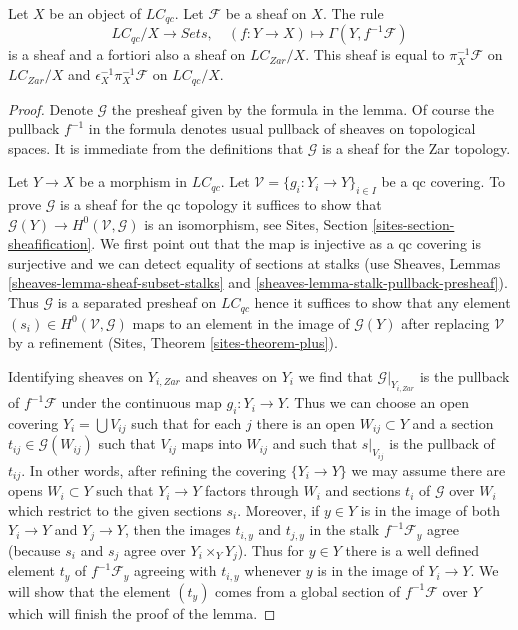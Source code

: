 \begin{lemma}
\label{lemma-describe-pullback-pi}
Let $X$ be an object of $\textit{LC}_{qc}$. Let $\mathcal{F}$ be a
sheaf on $X$. The rule
$$
\textit{LC}_{qc}/X \longrightarrow \textit{Sets},\quad
(f : Y \to X) \longmapsto \Gamma(Y, f^{-1}\mathcal{F})
$$
is a sheaf and a fortiori also a sheaf on $\textit{LC}_{Zar}/X$.
This sheaf is equal to
$\pi_X^{-1}\mathcal{F}$ on $\textit{LC}_{Zar}/X$ and
$\epsilon_X^{-1}\pi_X^{-1}\mathcal{F}$ on $\textit{LC}_{qc}/X$.
\end{lemma}

\begin{proof}
Denote $\mathcal{G}$ the presheaf given by the formula in the lemma.
Of course the pullback $f^{-1}$ in the formula denotes usual
pullback of sheaves on topological spaces. It is immediate
from the definitions that $\mathcal{G}$ is a sheaf for the Zar
topology.

\medskip\noindent
Let $Y \to X$ be a morphism in $\textit{LC}_{qc}$. Let
$\mathcal{V} = \{g_i : Y_i \to Y\}_{i \in I}$ be a qc covering.
To prove $\mathcal{G}$ is a sheaf for the qc topology it
suffices to show that
$\mathcal{G}(Y) \to H^0(\mathcal{V}, \mathcal{G})$
is an isomorphism, see Sites, Section \ref{sites-section-sheafification}.
We first point out that the map is injective as a qc covering
is surjective and we can detect equality of sections at stalks
(use Sheaves, Lemmas \ref{sheaves-lemma-sheaf-subset-stalks} and
\ref{sheaves-lemma-stalk-pullback-presheaf}). Thus
$\mathcal{G}$ is a separated presheaf on $\textit{LC}_{qc}$
hence it suffices to show that any element
$(s_i) \in H^0(\mathcal{V}, \mathcal{G})$
maps to an element in the image of $\mathcal{G}(Y)$
after replacing $\mathcal{V}$ by a refinement
(Sites, Theorem \ref{sites-theorem-plus}).

\medskip\noindent
Identifying sheaves on $Y_{i, Zar}$ and sheaves on $Y_i$ we find that
$\mathcal{G}|_{Y_{i, Zar}}$ is the pullback of $f^{-1}\mathcal{F}$ under
the continuous map $g_i : Y_i \to Y$. Thus we can choose an open covering
$Y_i = \bigcup V_{ij}$ such that for each $j$ there is an open
$W_{ij} \subset Y$ and a section $t_{ij} \in \mathcal{G}(W_{ij})$
such that $V_{ij}$ maps into $W_{ij}$ and such that
$s|_{V_{ij}}$ is the pullback of $t_{ij}$. In other words,
after refining the covering $\{Y_i \to Y\}$ we may assume there
are opens $W_i \subset Y$ such that $Y_i \to Y$ factors through $W_i$
and sections $t_i$ of $\mathcal{G}$ over $W_i$ which restrict
to the given sections $s_i$. Moreover, if $y \in Y$ is in the image
of both $Y_i \to Y$ and $Y_j \to Y$, then the images $t_{i, y}$
and $t_{j, y}$ in the stalk $f^{-1}\mathcal{F}_y$ agree
(because $s_i$ and $s_j$ agree over $Y_i \times_Y Y_j$).
Thus for $y \in Y$ there is a well defined element $t_y$ of
$f^{-1}\mathcal{F}_y$ agreeing with $t_{i, y}$ whenever $y$
is in the image of $Y_i \to Y$.
We will show that the element $(t_y)$ comes from a global section
of $f^{-1}\mathcal{F}$ over $Y$ which will finish the proof of the lemma.


\end{proof}
